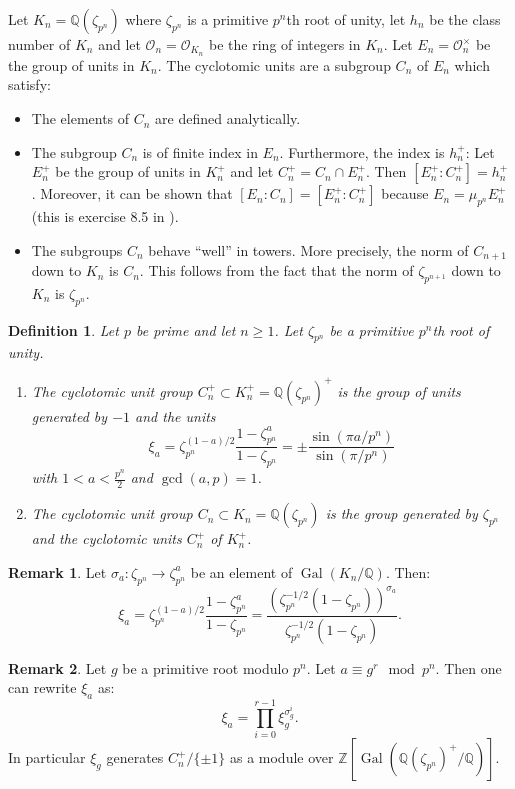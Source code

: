 \documentclass[12pt]{article}
\newtheorem{defn1}{Definition}
\theoremstyle{definition}
\newtheorem{remark}{Remark}
\newcommand{\Ints}{\mathbb{Z}}
\newcommand{\Rats}{\mathbb{Q}}
\newcommand{\Gal}{\operatorname{Gal}}
\begin{document}
Let $K_n=\Rats(\zeta_{p^n})$ where $\zeta_{p^n}$ is a primitive
$p^n$th root of unity, let $h_n$ be the class number of $K_n$ and
let $\mathcal{O}_n=\mathcal{O}_{K_n}$ be the ring of integers in
$K_n$. Let $E_n=\mathcal{O}_n^\times$ be the group of units in
$K_n$. The cyclotomic units are a subgroup $C_n$ of $E_n$ which
satisfy:
\begin{itemize}
\item The elements of $C_n$ are defined analytically.

\item The subgroup $C_n$ is of finite index in $E_n$. Furthermore,
the index is  $h_{n}^+$: Let $E^+_n$ be the group of units in
$K^+_n$ and let $C^+_n=C_n\cap E^+_n$. Then
$[E_n^+:C_n^+]=h_{n}^+$. Moreover, it can be shown that
$[E_n:C_n]=[E_n^+:C_n^+]$ because $E_n=\mu_{p^n}E_n^+$ (this is
exercise 8.5 in \cite{wash}).

\item The subgroups $C_n$ behave ``well'' in towers. More
precisely, the norm of $C_{n+1}$ down to $K_{n}$ is $C_{n}$. This
follows from the fact that the norm of $\zeta_{p^{n+1}}$ down to
$K_{n}$ is $\zeta_{p^n}$.
\end{itemize}

\begin{defn1}
Let $p$ be prime and let $n\geq 1$. Let $\zeta_{p^n}$ be a
primitive $p^n$th root of unity.
\begin{enumerate}
\item The cyclotomic unit group $C_n^+\subset
K_n^+=\Rats(\zeta_{p^n})^+$ is the group of units generated by
$-1$ and the units
$$\xi_a=\zeta_{p^n}^{(1-a)/2}\frac{1-\zeta_{p^n}^a}{1-\zeta_{p^n}}=\pm \frac{\sin(\pi a/p^n)}{\sin(\pi/p^n)}$$
with $1<a<\frac{p^n}{2}$ and $\gcd(a,p)=1$.

\item The cyclotomic unit group $C_n\subset
K_n=\Rats(\zeta_{p^n})$ is the group generated by $\zeta_{p^n}$
and the cyclotomic units $C_n^+$ of $K_n^+$.
\end{enumerate}
\end{defn1}
\begin{remark}
Let $\sigma_a:\zeta_{p^n}\to \zeta_{p^n}^a$ be an element of
$\Gal(K_n/\Rats)$. Then:
$$\xi_a=\zeta_{p^n}^{(1-a)/2}\frac{1-\zeta_{p^n}^a}{1-\zeta_{p^n}}=
\frac{(\zeta_{p^n}^{-1/2}(1-\zeta_{p^n}))^{\sigma_a}}{\zeta_{p^n}^{-1/2}(1-\zeta_{p^n})}.$$
\end{remark}
\begin{remark}
\label{rem1} Let $g$ be a primitive root modulo $p^n$. Let
$a\equiv g^r \mod p^n$. Then one can rewrite $\xi_a$ as:
$$\xi_a=
\prod_{i=0}^{r-1}\xi_g^{\sigma_g^i}.$$ In particular $\xi_g$
generates $C_n^+/\{\pm 1\}$ as a module over
$\Ints[\Gal(\Rats(\zeta_{p^n})^+/\Rats)]$.
\end{remark}
\end{document}
